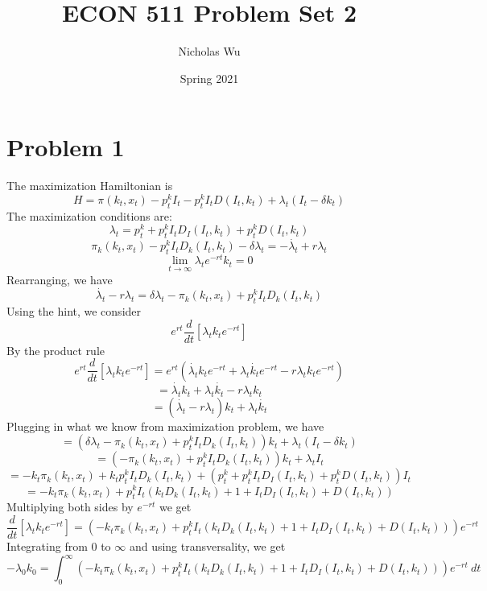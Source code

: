 \documentclass[10pt,letter]{article}
\newcommand{\problem}[1]{\section*{Problem #1}}
\begin{document}


\title{ECON 511 Problem Set 2}

\author{Nicholas Wu}

\date{Spring 2021}

\maketitle

\problem{1}
The maximization Hamiltonian is
\[ H = \pi(k_t, x_t)  - p^k_t I_t - p^k_t I_t D(I_t, k_t) + \lambda_t (I_t - \delta k_t)\]
The maximization conditions are:
\[ \lambda_t = p^k_t + p^k_t I_t D_I(I_t, k_t) + p^k_t D(I_t, k_t)  \]
\[ \pi_k(k_t, x_t) - p^k_t I_t D_k(I_t, k_t) - \delta \lambda_t = -\dot{\lambda_t} + r \lambda_t \]
\[ \lim_{t \to \infty} \lambda_t e^{-rt}k_t = 0 \]
Rearranging, we have
\[ \dot{\lambda_t} - r \lambda_t = \delta \lambda_t - \pi_k(k_t, x_t) + p^k_t I_t D_k(I_t, k_t)\]
Using the hint, we consider
\[ e^{rt} \frac{d}{dt}[\lambda_t k_t e^{-rt}]  \]
By the product rule
\[ e^{rt} \frac{d}{dt}[\lambda_t k_t e^{-rt}] =  e^{rt} \left( \dot{\lambda_t}k_t e^{-rt} + \lambda_t\dot{k_t}e^{-rt} - r\lambda_t k_t e^{-rt} \right) \]
\[ = \dot{\lambda_t} k_t + \lambda_t \dot{k_t} - r \lambda_t k_t \]
\[ = (\dot{\lambda_t} - r \lambda_t) k_t + \lambda_t \dot{k_t} \]
Plugging in what we know from maximization problem, we have
\[ = (\delta \lambda_t - \pi_k(k_t, x_t) + p^k_t I_t D_k(I_t, k_t))k_t + \lambda_t (I_t - \delta k_t) \]
\[ = (- \pi_k(k_t, x_t) + p^k_t I_t D_k(I_t, k_t))k_t + \lambda_t I_t \]
\[ = - k_t \pi_k(k_t, x_t) + k_t p^k_t I_t D_k(I_t, k_t) + (p^k_t + p^k_t I_t D_I(I_t, k_t) + p^k_t D(I_t, k_t)) I_t \]
\[ = - k_t \pi_k(k_t, x_t) + p^k_t I_t (k_t D_k(I_t, k_t) + 1 + I_tD_I(I_t, k_t) + D(I_t, k_t)) \]
Multiplying both sides by $e^{-rt}$ we get
\[ \frac{d}{dt}[\lambda_t k_t e^{-rt}] = \left(- k_t \pi_k(k_t, x_t) + p^k_t I_t (k_t D_k(I_t, k_t) + 1 + I_tD_I(I_t, k_t) + D(I_t, k_t)) \right) e^{-rt} \]
Integrating from 0 to $\infty$ and using transversality, we get
\[ - \lambda_0 k_0 = \int_0^\infty \left(- k_t \pi_k(k_t, x_t) + p^k_t I_t (k_t D_k(I_t, k_t) + 1 + I_t D_I(I_t, k_t) + D(I_t, k_t)) \right) e^{-rt} \ dt \]
\end{document}
